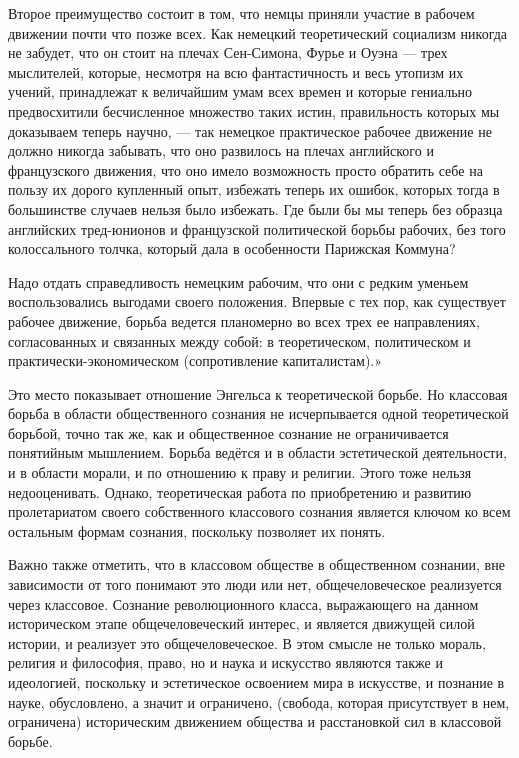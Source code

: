 \documentclass[12pt,a4paper,openany]{book}
\begin{document}
Второе преимущество состоит в том, что немцы приняли участие в рабочем движении почти что позже всех. Как немецкий теоретический социализм никогда не забудет, что он стоит на плечах Сен-Симона, Фурье и Оуэна — трех мыслителей, которые, несмотря на всю фантастичность и весь утопизм их учений, принадлежат к величайшим умам всех времен и которые гениально предвосхитили бесчисленное множество таких истин, правильность которых мы доказываем теперь научно, — так немецкое практическое рабочее движение не должно никогда забывать, что оно развилось на плечах английского и французского движения, что оно имело возможность просто обратить себе на пользу их дорого купленный опыт, избежать теперь их ошибок, которых тогда в большинстве случаев нельзя было избежать. Где были бы мы теперь без образца английских тред-юнионов и французской политической борьбы рабочих, без того колоссального толчка, который дала в особенности Парижская Коммуна?

Надо отдать справедливость немецким рабочим, что они с редким уменьем воспользовались выгодами своего положения. Впервые с тех пор, как существует рабочее движение, борьба ведется планомерно во всех трех ее направлениях, согласованных и связанных между собой: в теоретическом, политическом и практически-экономическом (сопротивление капиталистам).»

Это место показывает отношение Энгельса к теоретической борьбе. Но классовая борьба в области общественного сознания не исчерпывается одной теоретической борьбой, точно так же, как и общественное сознание не ограничивается понятийным мышлением. Борьба ведётся и в области эстетической деятельности, и в области морали, и по отношению к праву и религии. Этого тоже нельзя недооценивать. Однако, теоретическая работа по приобретению и развитию пролетариатом своего собственного классового сознания является ключом ко всем остальным формам сознания, поскольку позволяет их понять.

Важно также отметить, что в классовом обществе в общественном сознании, вне зависимости от того понимают это люди или нет, общечеловеческое реализуется через классовое. Сознание революционного класса, выражающего на данном историческом этапе общечеловеческий интерес, и является движущей силой истории, и реализует это общечеловеческое. В этом смысле не только мораль, религия и философия, право, но и наука и искусство являются также и идеологией, поскольку и эстетическое освоением мира в искусстве, и познание в науке, обусловлено, а значит и ограничено, (свобода, которая присутствует в нем, ограничена) историческим движением общества и расстановкой сил в классовой борьбе.
\end{document}
